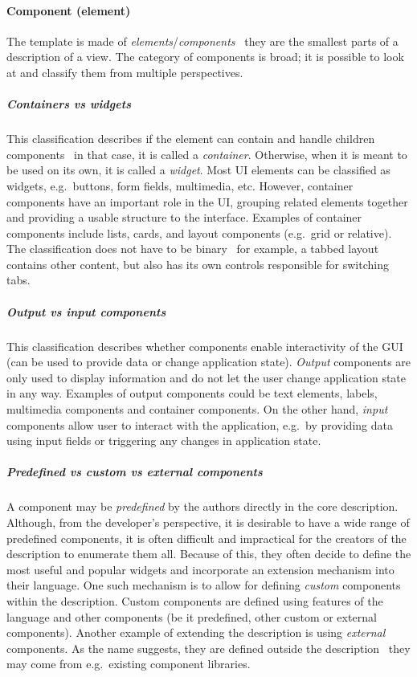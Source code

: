 \paragraph{Component (element)}
The template is made of \emph{elements}/\emph{components} \textendash\ they are the smallest parts of a description of a view.
The category of components is broad;
it is possible to look at and classify them from multiple perspectives.

\subparagraph{Containers vs widgets}
This classification describes if the element can contain and handle children components \textendash\ in that case, it is called a \emph{container}.
Otherwise, when it is meant to be used on its own, it is called a \emph{widget}.
Most UI elements can be classified as widgets, e.g.\ buttons, form fields, multimedia, etc.
However, container components have an important role in the UI, grouping related elements together and providing a usable structure to the interface.
Examples of container components include lists, cards, and layout components (e.g.\ grid or relative).
The classification does not have to be binary \textendash\ for example, a tabbed layout contains other content, but also has its own controls responsible for switching tabs.

\subparagraph{Output vs input components}
This classification describes whether components enable interactivity of the GUI (can be used to provide data or change application state).
\emph{Output} components are only used to display information and do not let the user change application state in any way.
Examples of output components could be text elements, labels, multimedia components and container components.
On the other hand, \emph{input} components allow user to interact with the application, e.g.\ by providing data using input fields or triggering any changes in application state.

\subparagraph{Predefined vs custom vs external components}
A component may be \emph{predefined} by the authors directly in the core description.
Although, from the developer's perspective, it is desirable to have a wide range of predefined components, it is often difficult and impractical for the creators of the description to enumerate them all.
Because of this, they often decide to define the most useful and popular widgets and incorporate an extension mechanism into their language.
One such mechanism is to allow for defining \emph{custom} components within the description.
Custom components are defined using features of the language and other components (be it predefined, other custom or external components).
Another example of extending the description is using \emph{external} components.
As the name suggests, they are defined outside the description \textendash\ they may come from e.g.\ existing component libraries.

